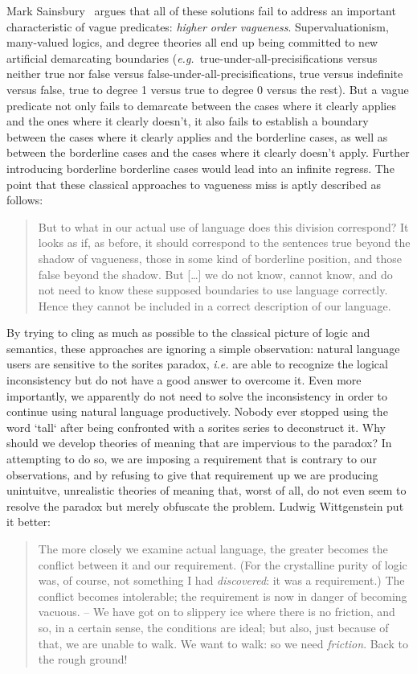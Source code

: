 \documentclass[a4paper]{article}
\begin{document}
Mark Sainsbury~\parencite*{sainsbury_concepts_1999} argues that all of these solutions fail to address an important characteristic of vague predicates: \emph{higher order vagueness}.
Supervaluationism, many-valued logics, and degree theories all end up being committed to new artificial demarcating boundaries (\emph{e.g.}~true-under-all-precisifications versus neither true nor false versus false-under-all-precisifications, true versus indefinite versus false, true to degree 1 versus true to degree 0 versus the rest).
But a vague predicate not only fails to demarcate between the cases where it clearly applies and the ones where it clearly doesn't, it also fails to establish a boundary between the cases where it clearly applies and the borderline cases, as well as between the borderline cases and the cases where it clearly doesn't apply.
Further introducing borderline borderline cases would lead into an infinite regress.
The point that these classical approaches to vagueness miss is aptly described as follows:
\begin{quote}
But to what in our actual use of language does this division correspond?
It looks as if, as before, it should correspond to the sentences true beyond the shadow of vagueness, those in some kind of borderline position, and those false beyond the shadow.
But [\ldots] we do not know, cannot know, and do not need to know these supposed boundaries to use language correctly.
Hence they cannot be included in a correct description of our language.%
~\parencite[256]{sainsbury_concepts_1999}
\end{quote}
By trying to cling as much as possible to the classical picture of logic and semantics, these approaches are ignoring a simple observation: natural language users are sensitive to the sorites paradox, \emph{i.e.} are able to recognize the logical inconsistency but do not have a good answer to overcome it.
Even more importantly, we apparently do not need to solve the inconsistency in order to continue using natural language productively.
Nobody ever stopped using the word `tall` after being confronted with a sorites series to deconstruct it.
Why should we develop theories of meaning that are impervious to the paradox?
In attempting to do so, we are imposing a requirement that is contrary to our observations, and by refusing to give that requirement up we are producing unintuitve, unrealistic theories of meaning that, worst of all, do not even seem to resolve the paradox but merely obfuscate the problem.
Ludwig Wittgenstein put it better:
\begin{quote}
The more closely we examine actual language, the greater becomes the conflict between it and our requirement.
(For the crystalline purity of logic was, of course, not something I had \emph{discovered}: it was a requirement.)
The conflict becomes intolerable; the requirement is now in danger of becoming vacuous.
-- We have got on to slippery ice where there is no friction, and so, in a certain sense, the conditions are ideal; but also, just because of that, we are unable to walk.
We want to walk: so we need \emph{friction}.
Back to the rough ground!%
~\parencite[\S 107]{wittgenstein_philosophical_1953}
\end{quote}
\end{document}
